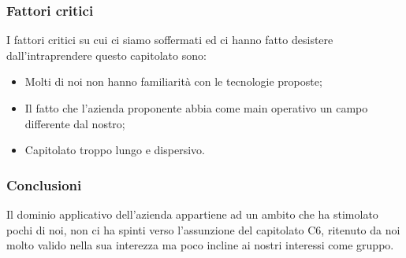 \documentclass[11pt]{article}
\begin{document}
    \subsubsection{Fattori critici}
    I fattori critici su cui ci siamo soffermati ed ci hanno fatto desistere dall'intraprendere questo capitolato sono:
    \begin{itemize}
            \item Molti di noi non hanno familiarità con le tecnologie proposte;
            \item Il fatto che l'azienda proponente abbia come main operativo un campo differente dal nostro; 
            \item Capitolato troppo lungo e dispersivo.
        \end{itemize}
        
        
    \subsubsection{Conclusioni}
    Il dominio applicativo dell'azienda appartiene ad un ambito che ha stimolato pochi di noi, non ci ha spinti verso l'assunzione 
    del capitolato C6, ritenuto da noi molto valido nella sua interezza ma poco incline ai nostri interessi come gruppo.
\end{document}
